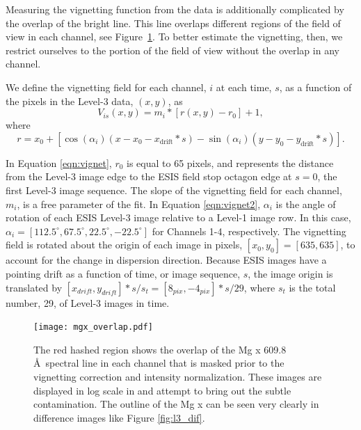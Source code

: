         Measuring the vignetting function from the data is additionally complicated by the overlap of the bright \mgxbright line.  This line overlaps different regions of the field of view in each channel, see Figure~\ref{fig:mgx_overlap}.  To  better estimate the vignetting, then, we restrict ourselves to the portion of the field of view without the \mgxbright overlap in any channel.  
        
        We define the vignetting field for each channel, $i$ at each time, $s$, as a function of the pixels in the Level-3 data, $(x,y)$, as 
        \begin{equation}
            V_{is}(x,y) = m_{i} * [r(x,y) - r_0] + 1,
            \label{eqn:vignet}
        \end{equation}
       	where
       	\begin{equation}
       		r = x_0 + [\cos(\alpha_i)(x-x_0-x_{\text{drift}}*s) - \sin(\alpha_i)(y-y_0-y_{\text{drift}}*s)].
        	\label{eqn:vignet2}
       	\end{equation}
       	
       	In Equation \ref{eqn:vignet}, $r_0$ is equal to 65 pixels, and represents the distance from the Level-3 image edge to the ESIS field stop octagon edge at $s = 0$, the first Level-3 image sequence.
       	The slope of the vignetting field for each channel, $m_{i}$, is a free parameter of the fit.
        In Equation \ref{eqn:vignet2},  $\alpha_i$ is the angle of rotation of each ESIS Level-3 image relative to a Level-1 image row.
        In this case, $\alpha_i = [112.5^{\circ}, 67.5^{\circ}, 22.5^{\circ}, -22.5^{\circ}]$ for Channels 1-4, respectively.
        The vignetting field is rotated about the origin of each image in pixels, $[x_0, y_0] = [635,635]$, to account for the change in dispersion direction.
        Because ESIS images have a pointing drift as a function of time, or image sequence, $s$, the image origin is translated by $[x_{drift},y_{drift}]*s/s_t = [8_{pix},-4_{pix}]*s/29$, where $s_t $ is the total number, 29, of Level-3 images in time. 
        
        \begin{figure}[htb!]
        	\centering
        	\texttt{[image: mgx\_overlap.pdf]}
        	\caption{The red hashed region shows the overlap of the Mg {\sc x} 609.8 \AA \ spectral line in each channel that is masked prior to the vignetting correction and intensity normalization. These images are displayed in log scale in and attempt to bring out the subtle contamination.  The outline of the Mg {\sc x} can be seen very clearly in difference images like Figure \ref{fig:l3_dif}. }

        	\label{fig:mgx_overlap}
        \end{figure}
        
